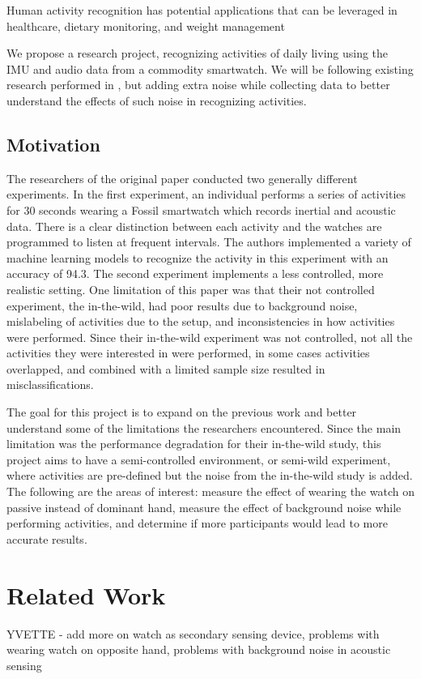 \documentclass[conference]{IEEEtran}
\begin{document}
	Human activity recognition has potential applications that can be leveraged in healthcare, dietary monitoring, and weight management
	
	We propose a research project, recognizing activities of daily living using the IMU and audio data from a commodity smartwatch. 
	We will be following existing research performed in \cite{2022_Leveraging_sound}, but adding extra noise while collecting data to better understand the effects of such noise in recognizing activities.
	
	\subsection{Motivation}
	The researchers of the original paper conducted two generally different experiments. In the first experiment, an individual performs a series of activities for 30 seconds wearing a Fossil smartwatch which records inertial and acoustic data. There is a clear distinction between each activity and the watches are programmed to listen at frequent intervals. The authors implemented a variety of machine learning models to recognize the activity in this experiment with an accuracy of 94.3. The second experiment implements a less controlled, more realistic setting.
	One limitation of this paper was that their not controlled experiment, the in-the-wild, had poor results due to background noise, mislabeling of activities due to the setup, and inconsistencies in how activities were performed.
	Since their in-the-wild experiment was not controlled, not all the activities they were interested in were performed, in some cases activities overlapped, and combined with a limited sample size resulted in misclassifications.
	
	The goal for this project is to expand on the previous work and better understand some of the limitations the researchers encountered.
	Since the main limitation was the performance degradation for their in-the-wild study, this project aims to have a semi-controlled environment, or semi-wild experiment, where activities are pre-defined but the noise from the in-the-wild study is added. 
	The following are the areas of interest: measure the effect of wearing the watch on passive instead of dominant hand, measure the effect of background noise while performing activities, and determine if more participants would lead to more accurate results.
	
	\section{Related Work}
	YVETTE - add more on watch as secondary sensing device, problems with wearing watch on opposite hand, problems with background noise in acoustic sensing
	
\end{document}
